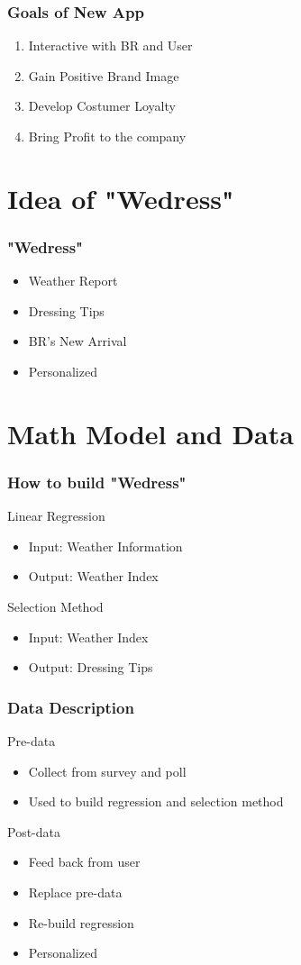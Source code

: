 \documentclass[compress,handout,10pt]{beamer}
\let\olditem\item
\renewcommand{\item}{\setlength{\itemsep}{0.5\baselineskip}\olditem}
\begin{document}
\begin{frame}
    \frametitle{Goals of New App}
     \begin{enumerate}
         \item Interactive with BR and User 
         \item Gain Positive Brand Image
         \item Develop Costumer Loyalty
         \item Bring Profit to the company
     \end{enumerate}
\end{frame}


\section{Idea of "Wedress"}
\begin{frame}
    \frametitle{"Wedress"}
      \begin{itemize}
         \item Weather Report 
         \item Dressing Tips
         \item BR's New Arrival
         \item Personalized
      \end{itemize}
\end{frame}

\section{Math Model and Data}

\begin{frame}
    \frametitle{How to build "Wedress"}
      Linear Regression
      \begin{itemize}
         \item Input: Weather Information
         \item Output: Weather Index
      \end{itemize}
     Selection Method
     \begin{itemize}
         \item Input: Weather Index
         \item Output: Dressing Tips
     \end{itemize}
\end{frame}

\begin{frame}
    \frametitle{Data Description}
     Pre-data
      \begin{itemize}
         \item Collect from survey and poll
         \item Used to build regression and selection method
      \end{itemize}
     Post-data
     \begin{itemize}
         \item Feed back from user
         \item Replace pre-data
         \item Re-build regression
         \item Personalized
     \end{itemize}
\end{frame}
\end{document}
